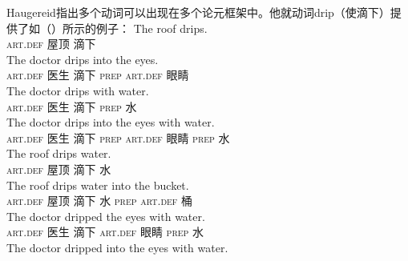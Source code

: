 \begin{exe}
\begin{xlist}[iv.]
\begin{exe}
\begin{xlist}[iv.]
\noindent
Haugereid指出多个动词可以出现在多个论元框架中。他就动词drip（使滴下）提供了如（）所示的例子：
\eal
\settowidth{}
\ex
\gll The roof drips.                    \\
     \textsc{art}.\textsc{def} 屋顶 滴下\\
\ex
\gll The doctor drips into the eyes.    \\
     \textsc{art}.\textsc{def} 医生 滴下 \textsc{prep} \textsc{art}.\textsc{def} 眼睛\\
\ex
\gll The doctor drips with water.       \\
     \textsc{art}.\textsc{def} 医生 滴下 \textsc{prep} 水\\
\ex
\gll The doctor drips into the eyes with water. \\
     \textsc{art}.\textsc{def} 医生 滴下 \textsc{prep} \textsc{art}.\textsc{def} 眼睛 \textsc{prep} 水\\
\ex
\gll The roof drips water.                      \\
     \textsc{art}.\textsc{def} 屋顶 滴下 水\\
\ex
\gll The roof drips water into the bucket.      \\
     \textsc{art}.\textsc{def} 屋顶 滴下 水 \textsc{prep} \textsc{art}.\textsc{def} 桶\\
\ex
\gll The doctor dripped the eyes with water.    \\
     \textsc{art}.\textsc{def} 医生 滴下 \textsc{art}.\textsc{def} 眼睛 \textsc{prep} 水\\
\ex
\gll The doctor dripped into the eyes with water. \\

\end{xlist}
\end{exe}
\end{xlist}
\end{exe}
